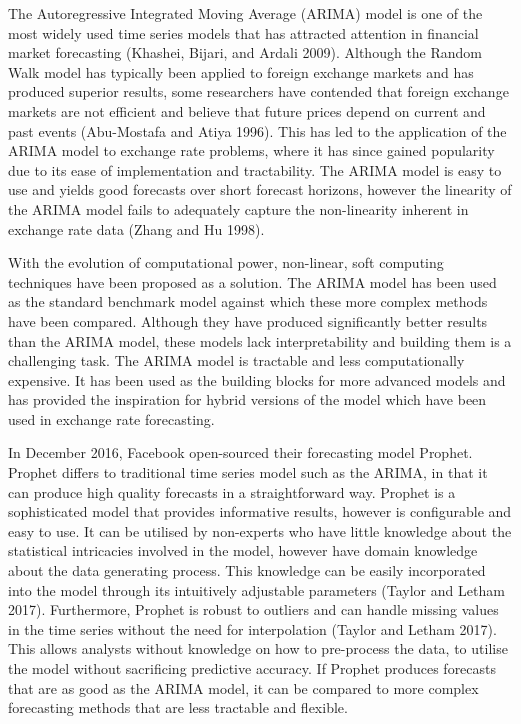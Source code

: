 \documentclass[12pt,a4paper]{article}
\numberwithin{equation}{section}
\numberwithin{figure}{section}
\numberwithin{table}{section}
\begin{document}
The Autoregressive Integrated Moving Average (ARIMA) model is one of the
most widely used time series models that has attracted attention in
financial market forecasting (Khashei, Bijari, and Ardali 2009).
Although the Random Walk model has typically been applied to foreign
exchange markets and has produced superior results, some researchers
have contended that foreign exchange markets are not efficient and
believe that future prices depend on current and past events
(Abu-Mostafa and Atiya 1996). This has led to the application of the
ARIMA model to exchange rate problems, where it has since gained
popularity due to its ease of implementation and tractability. The ARIMA
model is easy to use and yields good forecasts over short forecast
horizons, however the linearity of the ARIMA model fails to adequately
capture the non-linearity inherent in exchange rate data (Zhang and Hu
1998).

With the evolution of computational power, non-linear, soft computing
techniques have been proposed as a solution. The ARIMA model has been
used as the standard benchmark model against which these more complex
methods have been compared. Although they have produced significantly
better results than the ARIMA model, these models lack interpretability
and building them is a challenging task. The ARIMA model is tractable
and less computationally expensive. It has been used as the building
blocks for more advanced models and has provided the inspiration for
hybrid versions of the model which have been used in exchange rate
forecasting.

In December 2016, Facebook open-sourced their forecasting model Prophet.
Prophet differs to traditional time series model such as the ARIMA, in
that it can produce high quality forecasts in a straightforward way.
Prophet is a sophisticated model that provides informative results,
however is configurable and easy to use. It can be utilised by
non-experts who have little knowledge about the statistical intricacies
involved in the model, however have domain knowledge about the data
generating process. This knowledge can be easily incorporated into the
model through its intuitively adjustable parameters (Taylor and Letham
2017). Furthermore, Prophet is robust to outliers and can handle missing
values in the time series without the need for interpolation (Taylor and
Letham 2017). This allows analysts without knowledge on how to
pre-process the data, to utilise the model without sacrificing
predictive accuracy. If Prophet produces forecasts that are as good as
the ARIMA model, it can be compared to more complex forecasting methods
that are less tractable and flexible.
\end{document}
